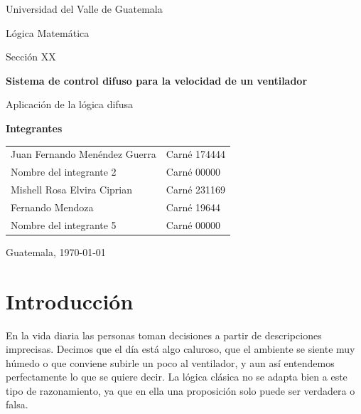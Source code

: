 \documentclass[11pt]{article}
\begin{document}
\begin{titlepage}
\centering
{\Large Universidad del Valle de Guatemala\par}
\vspace{0.4cm}
{\large Lógica Matemática\par}
\vspace{0.2cm}
{\large Sección XX\par} %
\vfill
{\LARGE\bfseries Sistema de control difuso para la velocidad de un ventilador\par}
\vspace{0.6cm}
{\large Aplicación de la lógica difusa\par}
\vfill
{\large\bfseries Integrantes\par}
\vspace{0.3cm}
{\large
\begin{tabular}{ll}
Juan Fernando Menéndez Guerra & Carné 174444 \\
Nombre del integrante 2 & Carné 00000 \\
Mishell Rosa Elvira Ciprian  & Carné 231169 \\
Fernando Mendoza & Carné 19644 \\
Nombre del integrante 5 & Carné 00000 \\
\end{tabular}\par}
\vfill
\vspace{0.6cm}
{\large Guatemala, \today\par}
\end{titlepage}

\tableofcontents
\newpage

\section{Introducción}

En la vida diaria las personas toman decisiones a partir de descripciones imprecisas. Decimos que el día está algo caluroso, que el ambiente se siente muy húmedo o que conviene subirle un poco al ventilador, y aun así entendemos perfectamente lo que se quiere decir. La lógica clásica no se adapta bien a este tipo de razonamiento, ya que en ella una proposición solo puede ser verdadera o falsa.
\end{document}
